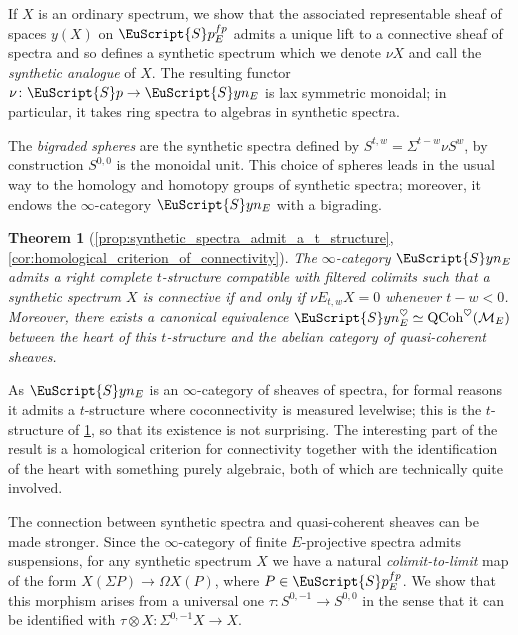 \documentclass[oneside,a4paper]{amsart}
\newcommand{\euscr}[1]{\EuScript{#1}} %
\newcommand{\QCoh}{\textnormal{QCoh}} %
\newcommand{\spectra}{\euscr{S}p} %
\newcommand{\synspectra}{\euscr{S}yn} %
\newcommand{\spectrafp}{\spectra_{E}^{fp}} %
\theoremstyle{plain}
\newtheorem{thm}{Theorem}[section]
\theoremstyle{definition}
\theoremstyle{remark}
\begin{document}
If $X$ is an ordinary spectrum, we show that the associated representable sheaf of spaces $y(X)$ on $\spectra_{E}^{fp}$ admits a unique lift to a connective sheaf of spectra and so defines a synthetic spectrum which we denote $\nu X$ and call the \emph{synthetic analogue} of $X$. The resulting functor $\nu \colon \spectra \rightarrow \synspectra_{E}$ is lax symmetric monoidal; in particular, it takes ring spectra to algebras in synthetic spectra. 

The \emph{bigraded spheres} are the synthetic spectra defined by $S^{t, w} = \Sigma^{t-w} \nu S^{w}$, by construction $S^{0, 0}$ is the monoidal unit. This choice of spheres leads in the usual way to the homology and homotopy groups of synthetic spectra; moreover, it endows the $\infty$-category $\synspectra_{E}$ with a bigrading. 

\begin{thm}[\ref{prop:synthetic_spectra_admit_a_t_structure}, \ref{cor:homological_criterion_of_connectivity}]
\label{thm:introduction_existence_of_homological_t_structure}
The $\infty$-category $\synspectra_{E}$ admits a right complete $t$-structure compatible with filtered colimits such that a synthetic spectrum $X$ is connective if and only if $\nu E_{t, w} X = 0$ whenever $t - w < 0$. Moreover, there exists a canonical equivalence $\synspectra_{E}^{\heartsuit} \simeq \QCoh^{\heartsuit}(\mathcal{M}_{E})$ between the heart of this $t$-structure and the abelian category of quasi-coherent sheaves.
\end{thm}
As $\synspectra_{E}$ is an $\infty$-category of sheaves of spectra, for formal reasons it admits a $t$-structure where coconnectivity is measured levelwise; this is the $t$-structure of \cref{thm:introduction_existence_of_homological_t_structure}, so that its existence is not surprising. The interesting part of the result is a homological criterion for connectivity together with the identification of the heart with something purely algebraic, both of which are technically quite involved.  

The connection between synthetic spectra and quasi-coherent sheaves can be made stronger. Since the $\infty$-category of finite $E$-projective spectra admits suspensions, for any synthetic spectrum $X$ we have a natural \emph{colimit-to-limit} map of the form $X(\Sigma P) \rightarrow \Omega X(P)$, where $P \in \spectrafp$. We show that this morphism arises from a universal one $\tau \colon S^{0, -1} \rightarrow S^{0, 0}$ in the sense that it can be identified with $\tau \otimes X \colon \Sigma^{0, -1} X \rightarrow X$. 
\end{document}
